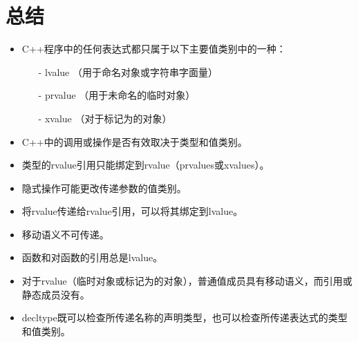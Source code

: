 \section{总结}
\begin{itemize}
	\item C++程序中的任何表达式都只属于以下主要值类别中的一种：
	\begin{itemize}
		\item[-] lvalue （用于命名对象或字符串字面量）
		\item[-] prvalue （用于未命名的临时对象）
		\item[-] xvalue （对于标记为的对象）
	\end{itemize}
	\item C++中的调用或操作是否有效取决于类型和值类别。
	\item 类型的rvalue引用只能绑定到rvalue（prvalues或xvalues）。
	\item 隐式操作可能更改传递参数的值类别。
	\item 将rvalue传递给rvalue引用，可以将其绑定到lvalue。
	\item 移动语义不可传递。
	\item 函数和对函数的引用总是lvalue。
	\item 对于rvalue（临时对象或标记为的对象），普通值成员具有移动语义，而引用或静态成员没有。
	\item decltype既可以检查所传递名称的声明类型，也可以检查所传递表达式的类型和值类别。
\end{itemize}


